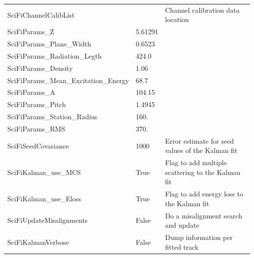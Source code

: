 \begin{tabular}{| l | l | p{8cm} |}
  SciFiChannelCalibList & & Channel calibration data location \\
  SciFiParams\_Z & 5.61291 & \\
  SciFiParams\_Plane\_Width & 0.6523 & \\
  SciFiParams\_Radiation\_Legth & 424.0 & \\
  SciFiParams\_Density & 1.06 & \\
  SciFiParams\_Mean\_Excitation\_Energy & 68.7 & \\
  SciFiParams\_A & 104.15 & \\
  SciFiParams\_Pitch & 1.4945 & \\
  SciFiParams\_Station\_Radius & 160. & \\
  SciFiParams\_RMS & 370. & \\
  SciFiSeedCovariance & 1000 & Error estimate for seed values of the Kalman fit \\
  SciFiKalman\_use\_MCS & True & Flag to add multiple scattering to the Kalman fit \\
  SciFiKalman\_use\_Eloss & True & Flag to add energy loss to the Kalman fit \\
  SciFiUpdateMisalignments & False & Do a misalignment search and update \\
  SciFiKalmanVerbose & False & Dump information per fitted track \\
  \hline  
\end{tabular}
\renewcommand{\arraystretch}{1.0}



